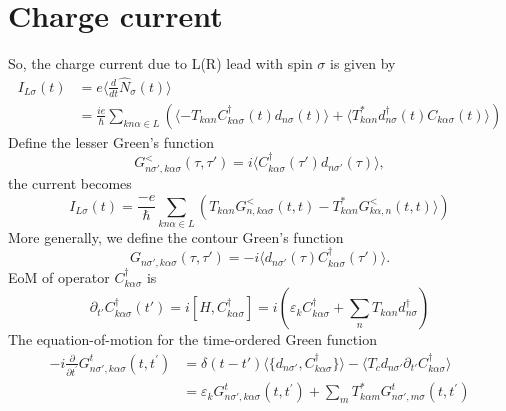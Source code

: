 \documentclass[11pt,a4paper]{article}
\begin{document}
\section{Charge current }
So, the charge current due to L(R) lead with spin $\sigma$ is given by
\begin{equation}
\begin{split}
I_{L\sigma}(t) &= e\langle\frac{d}{dt}\hat{N}_{\sigma}(t)\rangle \\
&=\frac{ie}{\hbar}\sum_{kn\alpha\in L}(\langle -T_{k \alpha n} C_{k \alpha \sigma}^{\dag}(t) d_{n\sigma}(t)\rangle + \langle T_{k \alpha n}^{*} d_{n\sigma}^{\dag}(t)C_{k \alpha \sigma}(t)\rangle)
\end{split}
\end{equation}
Define the lesser Green's function
\begin{equation}
G_{n\sigma',k\alpha\sigma}^{<}(\tau,\tau') = i\langle C_{k\alpha\sigma}^{\dag}(\tau') d_{n\sigma'}(\tau)\rangle ,
\label{eq:contour}
\end{equation}
the current becomes
\begin{equation}
I_{L\sigma}(t)=\frac{-e}{\hbar}\sum_{kn\alpha\in L}(T_{k\alpha n}G_{n,k\alpha\sigma}^{<}(t,t) - T_{k \alpha n}^{*} G_{k\alpha,n}^{<}(t,t)\rangle)
\end{equation}
More generally, we define the contour Green's function
\begin{equation}
G_{n\sigma',k\alpha\sigma}(\tau,\tau') = -i\langle  d_{n\sigma'}(\tau) C_{k\alpha\sigma}^{\dag}(\tau')\rangle .
\end{equation}
EoM of operator $C_{k\alpha \sigma}^{\dag}$ is
\begin{equation}
\partial_{t'} C_{k\alpha \sigma}^{\dag}(t') = i[H, C_{k\alpha \sigma}^{\dag}] = i( \varepsilon_{k}C_{k\alpha \sigma}^{\dag} + \sum_{n}T_{k\alpha n}d_{n\sigma}^{\dag})
\end{equation}
The equation-of-motion for the time-ordered Green function
\begin{equation}
\begin{split}
-i \frac{\partial}{\partial t^{\prime}} G_{n\sigma',k\alpha\sigma}^{t} \left(t,t^{\prime}\right)&= \delta(t-t')\langle \{d_{n\sigma'}, C_{k\alpha\sigma}^{\dag}\}\rangle - \langle T_{c}d_{n\sigma'}\partial_{t'}C_{k\alpha\sigma}^{\dag}\rangle \\
&=\varepsilon_{k} G_{n\sigma',k\alpha\sigma}^{t}\left(t,t^{\prime}\right)+ \sum_{m} T_{k\alpha m}^{*} G_{n\sigma',m\sigma}^{t}(t,t^{\prime})
\end{split}
\end{equation}
\end{document}
